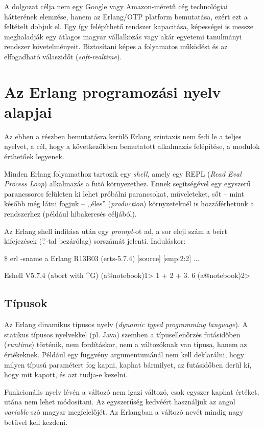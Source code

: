 \documentclass[12pt, a4paper, oneside]{book}
\begin{document}
A dolgozat célja nem egy Google vagy Amazon-méretű cég technológiai hátterének
elemzése, hanem az Erlang/OTP platform bemutatása, ezért ezt a feltételt dobjuk
el. Egy így felépíthető rendszer kapacitása, képességei is messze meghaladják
egy átlagos magyar vállalkozás vagy akár egyetemi tanulmányi rendszer
követelményeit. Biztosítani képes a folyamatos működést és az elfogadható
válaszidőt (\emph{soft-realtime}).

\chapter{Az Erlang programozási nyelv alapjai} 
Az ebben a részben bemutatásra kerülő Erlang szintaxis nem fedi le a teljes
nyelvet, a cél, hogy a következőkben bemutatott alkalmazás felépítése, a
modulok érthetőek legyenek.

Minden Erlang folyamathoz tartozik egy \emph{shell}, amely egy REPL (\emph{Read
Eval Process Loop}) alkalmazás a futó környezethez. Ennek segítségével egy
egyszerű parancssoros felületen ki lehet próbálni parancsokat, műveleteket, sőt
-- mint később még látni fogjuk -- ,,éles'' (\emph{production}) környzeteknél
is hozzáférhetünk a rendszerhez (például hibakeresés céljából).

Az Erlang shell indítása után egy \emph{prompt}-ot ad, a sor eleji szám a
beírt kifejezések ('.'-tal bezárólag) sorszámát jelenti. Induláskor:

\begin{code}{}{}
\$ erl -sname a
Erlang R13B03 (erts-5.7.4) [source] [smp:2:2] ...

Eshell V5.7.4  (abort with ^G)
(a@notebook)1> 1 + 2 + 3.
6
(a@notebook)2>
\end{code}

\section{Típusok} Az Erlang dinamikus típusos nyelv (\emph{dynamic typed
programming language}).  A statikus típusos nyelvekkel (pl. Java) szemben a
típusellenőrzés futásidőben (\emph{runtime}) történik, nem fordításkor, nem a
változóknak van típusa, hanem az értékeknek.  Például egy függvény
argumentumánál nem kell deklarálni, hogy milyen típusú paramétert fog kapni,
kaphat bármilyet, az futásidőben derül ki, hogy mit kapott, és azt tudja-e
kezelni. 

Funkcionális nyelv lévén a változó nem igazi változó, csak egyszer kaphat
értéket, utána nem lehet módosítani. Az egyszerűség kedvéért használjuk az
angol \emph{variable} szó magyar megfelelőjét. Az Erlangban a változó nevét
mindig nagy betűvel kell kezdeni.
\end{document}
